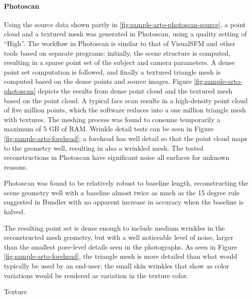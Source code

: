 \paragraph{Photoscan}
Using the source data shown partly in \ref{fig:sample-arto-photoscan-source}, a point cloud and a textured mesh was generated in Photoscan, using a quality setting of ``High''.
The workflow in Photoscan is similar to that of VisualSFM and other tools based on separate programs:
initially, the scene structure is computed, resulting in a sparse point set of the subject and camera parameters.
A dense point set computation is followed, and finally a textured triangle mesh is computed based on the dense points and source images.
Figure \ref{fig:sample-arto-photoscan} depicts the results from dense point cloud and the textured mesh based on the point cloud.
A typical face scan results in a high-density point cloud of five million points, which the software reduces into a one million triangle mesh with textures.
The meshing process was found to consume temporarily a maximum of 5 GB of RAM.
Wrinkle detail tests can be seen in Figure \ref{fig:sample-arto-forehead}; a forehead has well detail so that the point cloud maps to the geometry well, resulting in also a wrinkled mesh.
The tested reconstructions in Photoscan have significant noise all surfaces for unknown reasons.

Photoscan was found to be relatively robust to baseline length, reconstructing the scene geometry well with a baseline almost twice as much as the 15 degree rule suggested in Bundler with no apparent increase in accuracy when the baseline is halved.

The resulting point set is dense enough to include medium wrinkles in the reconstructed mesh geometry, but with a well noticeable level of noise, larger than the smallest pore-level details seen in the photographs.
As seen in Figure \ref{fig:sample-arto-forehead}, the triangle mesh is more detailed than what would typically be used by an end-user; the small skin wrinkles that show as color variations would be rendered as variation in the texture color.

Texture 



